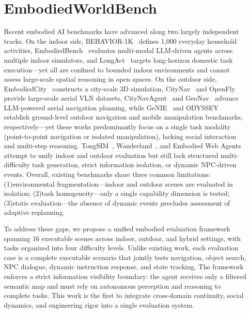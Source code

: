 \section{EmbodiedWorldBench}  
\label{sec:benchmark}  

Recent embodied AI benchmarks have advanced along two largely independent tracks.
On the indoor side, BEHAVIOR-1K~\cite{li2024behavior1k} defines 1{,}000 everyday household activities,
EmbodiedBench~\cite{yang2025embodiedbench} evaluates multi-modal LLM-driven agents across multiple indoor simulators,
and LongAct~\cite{zhu2026robotchores} targets long-horizon domestic task execution---yet
all are confined to bounded indoor environments and cannot assess large-scale spatial reasoning in open spaces.
On the outdoor side, EmbodiedCity~\cite{gao2024embodiedcity} constructs a city-scale 3D simulation,
CityNav~\cite{lee2025citynav} and OpenFly~\cite{gao2025openfly} provide large-scale aerial VLN datasets,
CityNavAgent~\cite{zhang2025citynavagent} and GeoNav~\cite{xu2025geonav} advance LLM-powered aerial navigation planning,
while GeNIE~\cite{wang2025genie} and ODYSSEY~\cite{wang2025odyssey} establish ground-level outdoor navigation and mobile manipulation benchmarks, respectively---yet
these works predominantly focus on a single task modality (point-to-point navigation or isolated manipulation), lacking social interaction and multi-step reasoning.
TongSIM~\cite{sun2025tongsim}, Wanderland~\cite{liu2026wanderland}, and Embodied Web Agents~\cite{hong2025embodiedweb} attempt to unify indoor and outdoor evaluation
but still lack structured multi-difficulty task generation, strict information isolation, or dynamic NPC-driven events.
Overall, existing benchmarks share three common limitations:
(1)environmental fragmentation---indoor and outdoor scenes are evaluated in isolation;
(2)task homogeneity---only a single capability dimension is tested;
(3)static evaluation---the absence of dynamic events precludes assessment of adaptive replanning.

To address these gaps, we propose a unified embodied evaluation framework spanning 16 executable scenes across indoor, outdoor, and hybrid settings, with tasks organized into four difficulty levels. Unlike existing work, each evaluation case is a complete executable scenario that jointly tests navigation, object search, NPC dialogue, dynamic instruction response, and state tracking. The framework enforces a strict information visibility boundary: the agent receives only a filtered semantic map and must rely on autonomous perception and reasoning to complete tasks. This work is the first to integrate cross-domain continuity, social dynamics, and engineering rigor into a single evaluation system.


